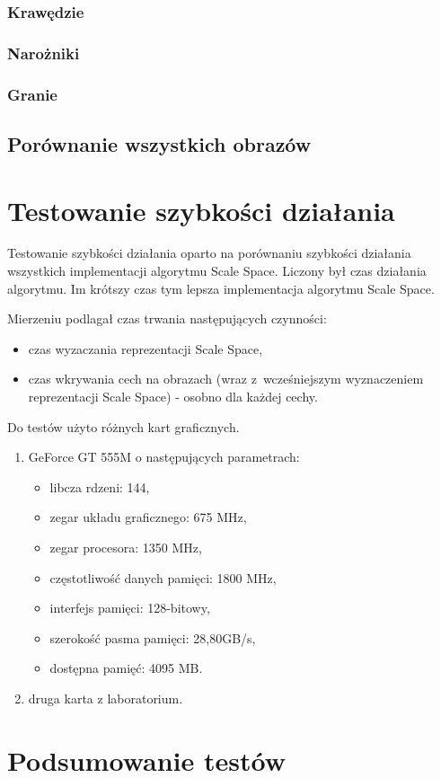 \subsubsection{Krawędzie}
\label{subsubsec:krawedzieRysunki}

\subsubsection{Narożniki}
\label{subsubsec:naroznikiRysunki}

\subsubsection{Granie}
\label{subsubsec:granieRysunki}

\subsection{Porównanie wszystkich obrazów}
\label{subsec:porownanieNumerycznePoprawnosc}


\section{Testowanie szybkości działania}
\label{sec:testSzybkosc1}

Testowanie szybkości działania oparto na porównaniu szybkości działania wszystkich implementacji algorytmu Scale Space. Liczony był czas działania algorytmu. Im krótszy czas tym lepsza implementacja algorytmu Scale Space.

Mierzeniu podlagał czas trwania następujących czynności:
\begin{itemize}
\item czas wyzaczania reprezentacji Scale Space,
\item czas wkrywania cech na obrazach (wraz z~wcześniejszym wyznaczeniem reprezentacji Scale Space) - osobno dla każdej cechy.
\end{itemize}

Do testów użyto różnych kart graficznych.
\begin{enumerate}
\item GeForce GT 555M \cite{GT555M} o następujących parametrach:
\begin{itemize}
\item libcza rdzeni: 144,
\item zegar układu graficznego: 675 MHz,
\item zegar procesora: 1350 MHz,
\item częstotliwość danych pamięci: 1800 MHz,
\item interfejs pamięci: 128-bitowy,
\item szerokość pasma pamięci: 28,80GB/s,
\item dostępna pamięć: 4095 MB.
\end{itemize}
\item druga karta z laboratorium.
\end{enumerate}


\section{Podsumowanie testów}
\label{sec:testPodsumowanie}

